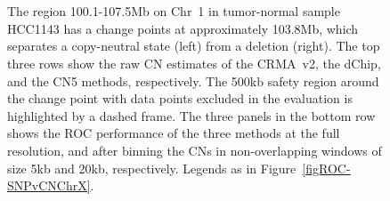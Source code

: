 \documentclass{bioinfo}
\begin{document}
\begin{figure}[!tpbh]
\begin{center}
  \\
  \\
\end{center}
 \caption{
  The region 100.1-107.5Mb on Chr~1 in tumor-normal sample HCC1143 has a change points at approximately 103.8Mb, which separates a copy-neutral state (left) from a deletion (right).
  The top three rows show the raw CN estimates of the CRMA~v2, the dChip, and the CN5 methods, respectively.  The 500kb safety region around the change point with data points excluded in the evaluation is highlighted by a dashed frame.  The three panels in the bottom row shows the ROC performance of the three methods at the full resolution, and after binning the CNs in non-overlapping windows of size 5kb and 20kb, respectively.  
  Legends as in Figure~\ref{figROC-SNPvCNChrX}.
 }
 \label{figROC-GSM337641,Chr01}
\end{figure} 
\end{document}

